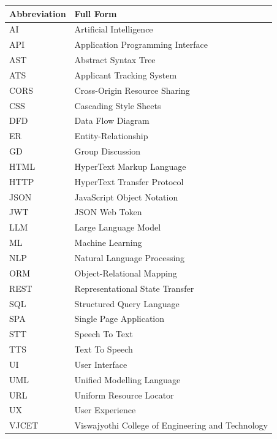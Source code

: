 \documentclass[12pt,a4paper]{report}
\renewcommand{\headrulewidth}{0.4pt}
\renewcommand{\footrulewidth}{0.4pt}
\renewcommand{\headrulewidth}{0pt}
\renewcommand{\footrulewidth}{0.4pt}
\begin{document}
\noindent
\begin{tabular}{p{} p{}}
\toprule
\textbf{Abbreviation} & \textbf{Full Form} \\
\midrule
AI    & Artificial Intelligence \\
API   & Application Programming Interface \\
AST   & Abstract Syntax Tree \\
ATS   & Applicant Tracking System \\
CORS  & Cross-Origin Resource Sharing \\
CSS   & Cascading Style Sheets \\
DFD   & Data Flow Diagram \\
ER    & Entity-Relationship \\
GD    & Group Discussion \\
HTML  & HyperText Markup Language \\
HTTP  & HyperText Transfer Protocol \\
JSON  & JavaScript Object Notation \\
JWT   & JSON Web Token \\
LLM   & Large Language Model \\
ML    & Machine Learning \\
NLP   & Natural Language Processing \\
ORM   & Object-Relational Mapping \\
REST  & Representational State Transfer \\
SQL   & Structured Query Language \\
SPA   & Single Page Application \\
STT   & Speech To Text \\
TTS   & Text To Speech \\
UI    & User Interface \\
UML   & Unified Modelling Language \\
URL   & Uniform Resource Locator \\
UX    & User Experience \\
VJCET & Viswajyothi College of Engineering and Technology \\
\bottomrule
\end{tabular}
\clearpage

\hypersetup{pageanchor=true}
\pagestyle{fancy}
\fancyhf{}
\fancyhead[R]{\small\textit{\leftmark}}
\fancyfoot[R]{\thepage}
\renewcommand{\headrulewidth}{0.4pt}
\renewcommand{\footrulewidth}{0.4pt}
\end{document}
